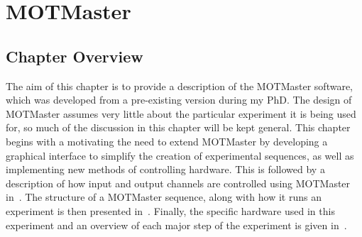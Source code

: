 \chapter{MOTMaster}\label{chap:compinterface}

\section{Chapter Overview}\label{sec:compinterface_overview}
The aim of this chapter is to provide a description of the MOTMaster
software, which was developed from a pre-existing version during my PhD. The
design of MOTMaster assumes very little about the particular experiment it is
being used for, so much of the discussion in this chapter will be kept
general. This chapter begins with a motivating the need to extend MOTMaster by
developing a graphical interface to simplify the creation of experimental
sequences, as well as implementing new methods of controlling hardware. This
is followed by a description of how input and output channels are controlled using MOTMaster in~. The structure of a MOTMaster sequence, along with how it runs an experiment is then presented in~. Finally, the specific hardware used in this experiment and an overview of each major step of the experiment is given in~.

